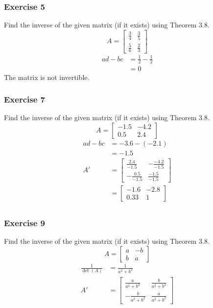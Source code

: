 \documentclass{math}
\begin{document}
\subsubsection*{Exercise 5}
Find the inverse of the given matrix (if it exists) using Theorem 3.8.
\[ A = \begin{bmatrix}\frac{3}{4} & \frac{3}{5} \\[0.25em]
  \frac{5}{6} & \frac{2}{3}\end{bmatrix} \]
\begin{align*}
  ad-bc &= \frac{1}{2}-\frac{1}{2} \\
  &= 0
\end{align*}
The matrix is not invertible.

\subsubsection*{Exercise 7}
Find the inverse of the given matrix (if it exists) using Theorem 3.8.
\[ A = \begin{bmatrix}-1.5 & -4.2 \\[0.25em] 0.5 & 2.4\end{bmatrix} \]
\begin{align*}
  ad-bc &= -3.6-(-2.1) \\
  &= -1.5 \\
  A' &= \begin{bmatrix}
    \frac{2.4}{-1.5} & -\frac{-4.2}{-1.5} \\[0.25em]
    -\frac{0.5}{-1.5} & \frac{-1.5}{-1.5}
  \end{bmatrix} \\
  &= \begin{bmatrix}
    -1.6 & -2.8 \\
    0.33 & 1
  \end{bmatrix} \\
\end{align*}

\subsubsection*{Exercise 9}
Find the inverse of the given matrix (if it exists) using Theorem 3.8.
\[ A = \begin{bmatrix}a & -b \\ b & a\end{bmatrix} \]
\begin{align*}
  \frac{1}{\det(A)} &= \frac{1}{a^2+b^2} \\
  A' &= \begin{bmatrix}
    \frac{a}{a^2+b^2} & \frac{b}{a^2+b^2} \\[0.25em]
    -\frac{b}{a^2+b^2} & \frac{a}{a^2+b^2}
  \end{bmatrix}
\end{align*}
\end{document}
